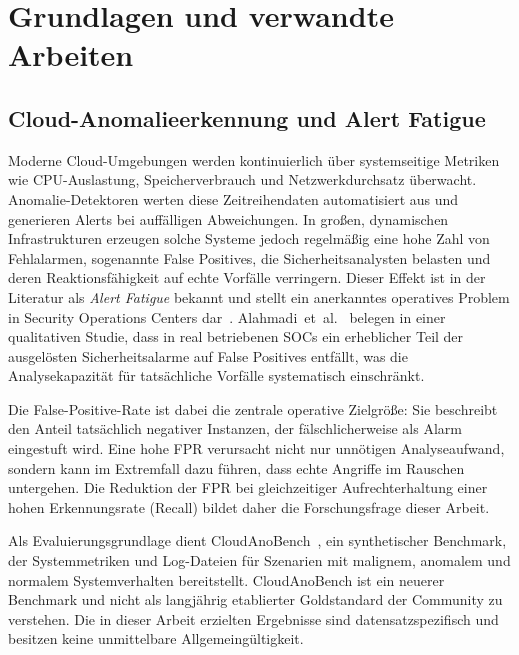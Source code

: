 
\section{Grundlagen und verwandte Arbeiten}

\subsection{Cloud-Anomalieerkennung und Alert Fatigue}

Moderne Cloud-Umgebungen werden kontinuierlich über systemseitige Metriken wie
CPU-Auslastung, Speicherverbrauch und Netzwerkdurchsatz überwacht. Anomalie-Detektoren
werten diese Zeitreihendaten automatisiert aus und generieren Alerts bei auffälligen
Abweichungen. In großen, dynamischen Infrastrukturen erzeugen solche Systeme jedoch
regelmäßig eine hohe Zahl von Fehlalarmen, sogenannte False Positives, die
Sicherheitsanalysten belasten und deren Reaktionsfähigkeit auf echte Vorfälle
verringern. Dieser Effekt ist in der Literatur als \emph{Alert Fatigue} bekannt
und stellt ein anerkanntes operatives Problem in Security Operations Centers dar~\cite{tariq2025alert}.
Alahmadi~et~al.~\cite{alahmadi202299} belegen in einer qualitativen Studie, dass
in real betriebenen SOCs ein erheblicher Teil der ausgelösten Sicherheitsalarme auf
False Positives entfällt, was die Analysekapazität für tatsächliche Vorfälle
systematisch einschränkt.

Die False-Positive-Rate ist dabei die zentrale operative Zielgröße: Sie
beschreibt den Anteil tatsächlich negativer Instanzen, der fälschlicherweise als
Alarm eingestuft wird. Eine hohe FPR verursacht nicht nur unnötigen Analyseaufwand,
sondern kann im Extremfall dazu führen, dass echte Angriffe im Rauschen untergehen.
Die Reduktion der FPR bei gleichzeitiger Aufrechterhaltung einer hohen
Erkennungsrate (Recall) bildet daher die Forschungsfrage dieser Arbeit.

Als Evaluierungsgrundlage dient CloudAnoBench~\cite{zou2025cloudanobench}, ein
synthetischer Benchmark, der Systemmetriken und Log-Dateien für Szenarien mit
malignem, anomalem und normalem Systemverhalten bereitstellt. CloudAnoBench ist
ein neuerer Benchmark und nicht als langjährig etablierter Goldstandard der
Community zu verstehen. Die in dieser Arbeit erzielten Ergebnisse sind
datensatzspezifisch und besitzen keine unmittelbare Allgemeingültigkeit.

